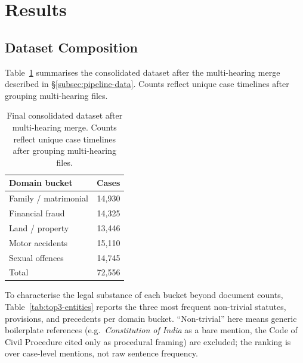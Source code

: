 \documentclass[runningheads]{llncs}
\begin{document}
\section{Results}
\label{sec:results}

\subsection{Dataset Composition}
\label{subsec:results-dataset}

Table~\ref{tab:dataset-overview} summarises the consolidated dataset after the multi-hearing merge described in \S\ref{subsec:pipeline-data}. Counts reflect unique case timelines after grouping multi-hearing files.

\begin{table}[!htbp]
\centering
\caption{Final consolidated dataset after multi-hearing merge. Counts reflect unique case timelines after grouping multi-hearing files.}
\label{tab:dataset-overview}
\begin{tabular}{lr}
\toprule
Domain bucket & Cases \\
\midrule
Family / matrimonial & 14{,}930 \\
Financial fraud & 14{,}325 \\
Land / property & 13{,}446 \\
Motor accidents & 15{,}110 \\
Sexual offences & 14{,}745 \\
\midrule
Total & 72{,}556 \\
\bottomrule
\end{tabular}
\end{table}

To characterise the legal substance of each bucket beyond document counts, Table~\ref{tab:top3-entities} reports the three most frequent non-trivial statutes, provisions, and precedents per domain bucket. ``Non-trivial'' here means generic boilerplate references (e.g.\ \emph{Constitution of India} as a bare mention, the Code of Civil Procedure cited only as procedural framing) are excluded; the ranking is over case-level mentions, not raw sentence frequency.
\end{document}

